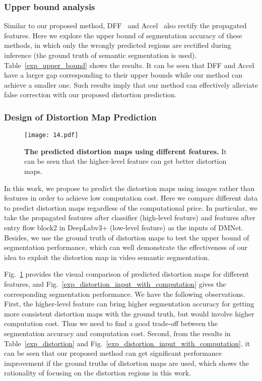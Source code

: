 \documentclass[journal]{IEEEtran}
\begin{document}
\subsubsection{Upper bound analysis}

Similar to our proposed method, DFF~\cite{zhu2017deep} and Accel~\cite{zhu2017deep} also rectify the propagated features. Here we explore the upper bound of segmentation accuracy of these methods, in which only the wrongly predicted regions are rectified during inference (the ground truth of semantic segmentation is used). 
Table~\ref{exp_upper_bound} shows the results. It can be seen that DFF and Accel have a larger gap corresponding to their upper bounds while our method can achieve a smaller one. Such results imply that our method can effectively alleviate false correction with our proposed distortion prediction.

\subsubsection{Design of Distortion Map Prediction}

\begin{figure}[t]
	\begin{center}
		\texttt{[image: 14.pdf]}
	\end{center}
	\caption{\textbf{The predicted distortion maps using different features.} It can be seen that the  higher-level  feature can get better distortion maps.}
	\label{distortion_input}
\end{figure}


In this work, we propose to predict the distortion maps using images rather than features in order to achieve low computation cost. Here we compare different data to predict distortion maps regardless of the computational price. In particular, we take the propagated features after classifier (high-level feature) and features after entry flow block2 in DeepLabv3+ (low-level feature) as the inputs of DMNet. Besides, we use the ground truth of distortion maps to test the upper bound of segmentation performance, which can well demonstrate the effectiveness of our idea to exploit the distortion map in video semantic segmentation. 

Fig.~\ref{distortion_input} provides the visual comparison of predicted distortion maps for different features, and Fig.~\ref{exp_distortion_input_with_computation} gives the corresponding segmentation performance. We have the following observations. First, the higher-level feature can bring higher segmentation accuracy for getting more consistent distortion maps with the ground truth, but would involve higher computation cost. Thus we need to find a good trade-off between the segmentation accuracy and computation cost. Second, from the results in Table~\ref{exp_distortion} and Fig.~\ref{exp_distortion_input_with_computation}, it can be seen that our proposed method can get significant performance improvement if the ground truths of distortion maps are used, which shows the rationality of focusing on the distortion regions in this work.
\end{document}
